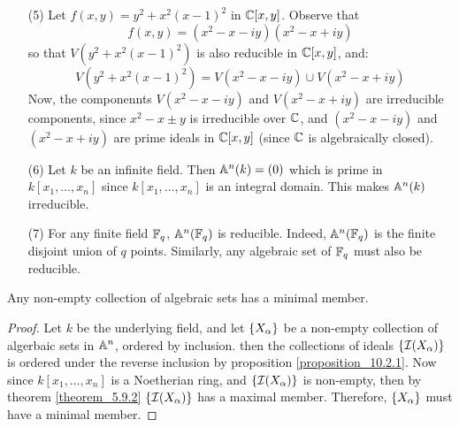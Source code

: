 \begin{example}
\begin{enumerate}
    \item[(5)] Let $f(x,y)=y^2+x^2(x-1)^2$ in $\mathbb{C}[x,y]$. Observe that
      \begin{equation*}
        f(x,y)=(x^2-x-iy)(x^2-x+iy)
      \end{equation*}
      so that $V(y^2+x^2(x-1)^2)$ is also reducible in $\mathbb{C}[x,y]$, and:
      \begin{equation*}
        V(y^2+x^2(x-1)^2)=V(x^2-x-iy) \cup V(x^2-x+iy)
      \end{equation*}
      Now, the componennts $V(x^2-x-iy)$ and $V(x^2-x+iy)$ are
      irreducible components, since $x^2-x \pm y$ is irreducible over
       $\mathbb{C}$, and $(x^2-x-iy)$ and $(x^2-x+iy)$ are prime ideals in
       $\mathbb{C}[x,y]$ (since $\mathbb{C}$ is algebraically closed).

    \item[(6)] Let $k$ be an infinite field. Then $\mathbb{A}^n(k)=(0)$ which
      is prime in $k[x_1, \dots, x_n]$ since $k[x_1, \dots, x_n]$ is
      an integral domain. This makes $\mathbb{A}^n(k)$ irreducible.

    \item[(7)] For any finite field $\mathbb{F}_q$,  $\mathbb{A}^n(\mathbb{F}_q)$ is
      reducible. Indeed, $\mathbb{A}^n(\mathbb{F}_q)$ is the finite disjoint union of
      $q$ points. Similarly, any algebraic set of $\mathbb{F}_q$ must also be
      reducible.
  \end{enumerate}
\end{example}

\begin{proposition}\label{proposition_10.3.2}
  Any non-empty collection of algebraic sets has a minimal member.
\end{proposition}
\begin{proof}
  Let $k$ be the underlying field, and let $\{X_\alpha\}$ be a non-empty
  collection of algerbaic sets in $\mathbb{A}^n$, ordered by inclusion. then
  the collections of ideals $\{\mathcal{I}(X_\alpha)\}$ is ordered under the
  reverse inclusion by proposition \ref{proposition_10.2.1}. Now
  since $k[x_1, \dots, x_n]$ is a Noetherian ring, and $\{\mathcal{I}(X_\alpha)\}$
  is non-empty, then by theorem \ref{theorem_5.9.2} $\{\mathcal{I}(X_\alpha)\}$
  has a maximal member. Therefore, $\{X_\alpha\}$ must have a minimal
  member.
\end{proof}

